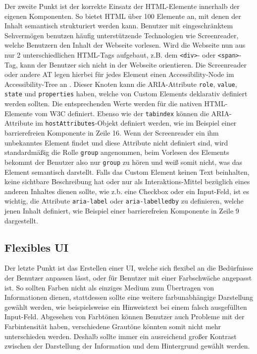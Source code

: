 Der zweite Punkt ist der korrekte Einsatz der \ac{HTML}-Elemente innerhalb der eigenen Komponenten. So bietet \ac{HTML} über 100 Elemente an, mit denen der Inhalt semantisch strukturiert werden kann. Benutzer mit eingeschränktem Sehvermögen benutzen häufig unterstützende Technologien wie Screenreader, welche Benutzern den Inhalt der Webseite vorlesen. Wird die Webseite nun aus nur 2 unterschiedlichen \ac{HTML}-Tags aufgebaut, z.B. dem \texttt{\textless{}div\textgreater{}}- oder \texttt{\textless{}span\textgreater{}}-Tag, kann der Benutzer sich nicht in der Webseite orientieren. Die Screenreader oder andere \ac{AT} legen hierbei für jedes Element einen Accessibility-Node im Accessibility-Tree an \cite{citeulike:13915306}. Dieser Knoten kann die \ac{ARIA}-Attribute \texttt{role}, \texttt{value}, \texttt{state} und \texttt{properties} haben, welche von Custom Elements deklarativ definiert werden sollten. Die entsprechenden Werte werden für die nativen \ac{HTML}-Elemente vom \ac{W3C} definiert. Ebenso wie der \texttt{tabindex} können die \ac{ARIA}-Attribute im \texttt{hostAttributes}-Objekt definiert werden, wie im Beispiel einer barrierefreien Komponente in Zeile 16. Wenn der Screenreader ein ihm unbekanntes Element findet und diese Attribute nicht definiert sind, wird standardmäßig die Rolle \texttt{group} angenommen, beim Vorlesen des Elements bekommt der Benutzer also nur \texttt{group} zu hören und weiß somit nicht, was das Element semantisch darstellt. Falls das Custom Element keinen Text beinhalten, keine sichtbare Beschreibung hat oder nur als Interaktions-Mittel bezüglich eines anderen Inhaltes dienen sollte, wie z.b. eine Checkbox oder ein Input-Feld, ist es wichtig, die Attribute \texttt{aria-label} oder \texttt{aria-labelledby} zu definieren, welche jenen Inhalt definiert, wie Beispiel einer barrierefreien Komponente in Zeile 9 dargestellt.


\subsection{Flexibles UI}\label{flexibles-ui}

Der letzte Punkt ist das Erstellen einer \ac{UI}, welche sich flexibel an die Bedürfnisse der Benutzer anpassen lässt, oder für Benutzer mit einer Farbschwäche angepasst ist. So sollten Farben nicht als einziges Medium zum Übertragen von Informationen dienen, stattdessen sollte eine weitere farbunabhängige Darstellung gewählt werden, wie beispielsweise ein Hinweistext bei einem falsch ausgefüllten Input-Feld. Abgesehen von Farbtönen können Benutzer auch Probleme mit der Farbintensität haben, verschiedene Grautöne könnten somit nicht mehr unterschieden werden. Deshalb sollte immer ein ausreichend großer Kontrast zwischen der Darstellung der Information und dem Hintergrund gewählt werden.

